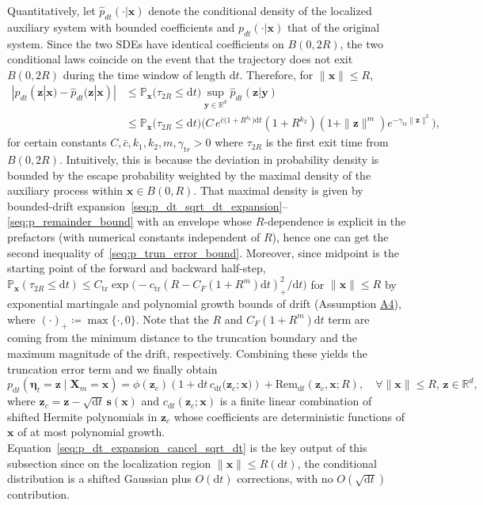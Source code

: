 \documentclass[
 longbibliography,
 twocolumn,
 superscriptaddress,
 amsmath,
 amssymb,
 amsthm,
 amsfonts,
 prl,
 floatfix,
]{revtex4-2}
\begin{document}
\begin{widetext}
Quantitatively, let $\hat p_{dt}(\cdot|\bm x)$ denote the conditional density of the localized auxiliary system with bounded coefficients
and $p_{dt}(\cdot|\bm x)$ that of the original system. Since the two SDEs have identical coefficients on $B(0,2R)$,
the two conditional laws coincide on the event that the trajectory does not exit $B(0,2R)$ during the time window of length $\mathrm dt$.
Therefore, for $\|\bm x\|\le R$,
\begin{equation}
\begin{aligned}
    |p_{dt}(\bm z|\bm x)-\hat p_{dt}(\bm z|\bm x)|
    &\le \mathbb{P}_{\bm x}\!\big(\tau_{2R}\le\mathrm dt\big)
    \sup_{\bm y\in\mathbb R^d}\hat p_{dt}(\bm z|\bm y)\\
    &\le \mathbb{P}_{\bm x}\!\big(\tau_{2R}\le\mathrm dt\big)
    \Big(C\,e^{\bar c\big(1+R^{k_1}\big)\mathrm dt} (1+R^{k_2})(1+\|\bm z\|^m)e^{-\gamma_{\mathrm{tr}}\|\bm z\|^2}\Big),
    \label{seq:p_trun_error_bound}
\end{aligned}
\end{equation}
for certain constants $C,\bar c, k_1, k_2, m, \gamma_{\mathrm tr}>0$ where $\tau_{2R}$ is the first exit time from $B(0,2R)$. 
Intuitively, this is because the deviation in probability density is bounded by the escape probability weighted by the maximal density of the auxiliary process within $\bm x\in B(0,R)$.
That maximal density is given by bounded-drift expansion~\eqref{seq:p_dt_sqrt_dt_expansion}--\eqref{seq:p_remainder_bound} with an envelope whose $R$-dependence is explicit in the prefactors (with numerical constants independent of $R$), hence one can get the second inequality of~\eqref{seq:p_trun_error_bound}.
Moreover, since midpoint is the starting point of the forward and backward half-step, $\mathbb{P}_{\bm x}(\tau_{2R}\le\mathrm dt)\le C_{\mathrm{tr}} \exp\big(\!\!-\!c_{\mathrm{tr}}(R-C_F(1+R^m)\mathrm dt)^2_+/\mathrm dt\big)$ for $\|\bm x\|\le R$ by exponential martingale and polynomial growth bounds of drift (Assumption \hyperlink{assumption:A4}{A4}), where $(\cdot)_+\coloneq\max\{\cdot,0\}$. Note that the $R$ and $C_F(1+R^m)\mathrm dt$ term are coming from the minimum distance to the truncation boundary and the maximum magnitude of the drift, respectively. Combining these yields the truncation error term and we finally obtain
\begin{equation}
    p_{\mathrm dt}(\bm\eta_t=\bm z \mid \bm X_m=\bm x)
    =\phi\!\left(\bm z_c\right)
    \!\!\left(1+\mathrm dt\,c_{\mathrm dt}\big(\bm z_c;\bm x\big)\right)
    +\mathrm{Rem}_{\mathrm dt}\!\left(\bm z_c,\bm x;R\right),
    \quad\forall\|\bm x\|\leq R,\,\bm z\in\mathbb R^d,
    \label{seq:p_dt_expansion_cancel_sqrt_dt}
\end{equation}
where $\bm z_c=\bm z-\sqrt{\mathrm dt}\,\bm s(\bm x)$ and $c_{\mathrm dt}(\bm z_c;\bm x)$ is a finite linear combination of shifted Hermite polynomials in $\bm z_c$ whose coefficients are deterministic functions of $\bm x$ of at most polynomial growth. 
Equation~\eqref{seq:p_dt_expansion_cancel_sqrt_dt} is the key output of this subsection since on the localization region $\|\bm x\|\leq R(\mathrm dt)$, the conditional distribution is a shifted Gaussian plus $O(\mathrm dt)$ corrections, with no $O(\sqrt{\mathrm dt})$ contribution.


\end{widetext}
\end{document}
